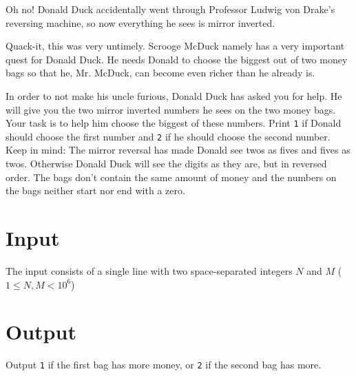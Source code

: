 Oh no! Donald Duck accidentally went through Professor Ludwig von Drake’s reversing machine, so now everything he sees is mirror inverted.

Quack-it, this was very untimely. Scrooge McDuck namely has a very important quest for Donald Duck. He needs Donald to choose the biggest out of two money bags so that he, Mr. McDuck, can become even richer than he already is.

In order to not make his uncle furious, Donald Duck has asked you for help. He will give you the two
mirror inverted numbers he sees on the two money bags. Your task is to help him choose the biggest
of these numbers. Print \texttt{1} if Donald should choose the first number and \texttt{2} if he should choose the
second number. Keep in mind: The mirror reversal has made Donald see twos as fives and fives as twos.
Otherwise Donald Duck will see the digits as they are, but in reversed order. The bags don't
contain the same amount of money and the numbers on the bags neither start nor end with a zero.

\section*{Input}
The input consists of a single line with two space-separated integers $N$ and $M$ ($1
\leq N, M < 10^6$)

\section*{Output}
Output \texttt{1} if the first bag has more money, or \texttt{2} if the second bag has more.
